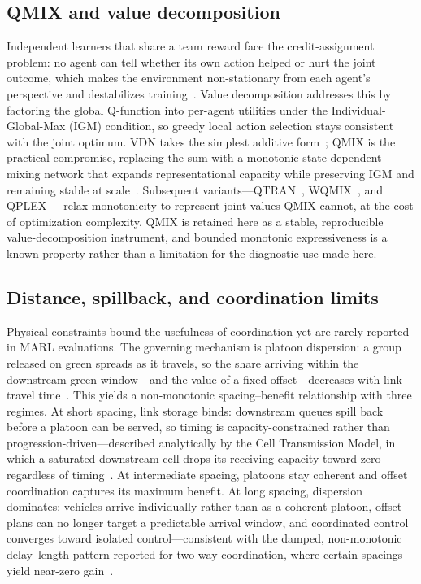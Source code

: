 \documentclass[review,12pt]{elsarticle}
\begin{document}
\subsection{QMIX and value decomposition}
\label{subsec:lit_qmix}

Independent learners that share a team reward face the credit-assignment problem: no agent can tell whether its own action helped or hurt the joint outcome, which makes the environment non-stationary from each agent's perspective and destabilizes training~\cite{foerster2018counterfactual}. Value decomposition addresses this by factoring the global Q-function into per-agent utilities under the Individual-Global-Max (IGM) condition, so greedy local action selection stays consistent with the joint optimum. VDN takes the simplest additive form~\cite{sunehag2017value}; QMIX is the practical compromise, replacing the sum with a monotonic state-dependent mixing network that expands representational capacity while preserving IGM and remaining stable at scale~\cite{Rashid2018}. Subsequent variants---QTRAN~\cite{son2019qtran}, WQMIX~\cite{rashid2020weighted}, and QPLEX~\cite{wang2021qplex}---relax monotonicity to represent joint values QMIX cannot, at the cost of optimization complexity. QMIX is retained here as a stable, reproducible value-decomposition instrument, and bounded monotonic expressiveness is a known property rather than a limitation for the diagnostic use made here.

\subsection{Distance, spillback, and coordination limits}
\label{subsec:lit_limits}

Physical constraints bound the usefulness of coordination yet are rarely reported in MARL evaluations. The governing mechanism is platoon dispersion: a group released on green spreads as it travels, so the share arriving within the downstream green window---and the value of a fixed offset---decreases with link travel time~\cite{robertson1969transyt,mingwei2012,zhihongyao2020}. This yields a non-monotonic spacing--benefit relationship with three regimes. At short spacing, link storage binds: downstream queues spill back before a platoon can be served, so timing is capacity-constrained rather than progression-driven---described analytically by the Cell Transmission Model, in which a saturated downstream cell drops its receiving capacity toward zero regardless of timing~\cite{daganzo1994cell}. At intermediate spacing, platoons stay coherent and offset coordination captures its maximum benefit. At long spacing, dispersion dominates: vehicles arrive individually rather than as a coherent platoon, offset plans can no longer target a predictable arrival window, and coordinated control converges toward isolated control---consistent with the damped, non-monotonic delay--length pattern reported for two-way coordination, where certain spacings yield near-zero gain~\cite{yanleicui2021}.
\end{document}

